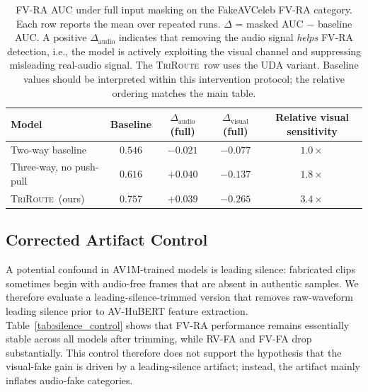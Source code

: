 \documentclass{article}
\newcommand{\method}{\textsc{TriRoute}}
\begin{document}
\begin{table}[t]
    \centering
    \caption{FV-RA AUC under full input masking on the FakeAVCeleb FV-RA category. Each row reports the mean over repeated runs. $\Delta$ = masked AUC $-$ baseline AUC. A positive $\Delta_{\mathrm{audio}}$ indicates that removing the audio signal \emph{helps} FV-RA detection, i.e., the model is actively exploiting the visual channel and suppressing misleading real-audio signal. The \method\ row uses the UDA variant. Baseline values should be interpreted within this intervention protocol; the relative ordering matches the main table.}
    \label{tab:perturbation}
    \small
    \begin{tabular}{lcccc}
        \toprule
        Model & Baseline & $\Delta_{\mathrm{audio}}$ (full) & $\Delta_{\mathrm{visual}}$ (full) & Relative visual sensitivity \\
        \midrule
        Two-way baseline        & $0.546$ & $-0.021$ & $-0.077$ & $1.0\times$ \\
        Three-way, no push-pull & $0.616$ & $+0.040$ & $-0.137$ & $1.8\times$ \\
        \method\ (ours)         & $\mathbf{0.757}$ & $\mathbf{+0.039}$ & $\mathbf{-0.265}$ & $\mathbf{3.4\times}$ \\
        \bottomrule
    \end{tabular}
\end{table}

\subsection{Corrected Artifact Control}

A potential confound in AV1M-trained models is leading silence: fabricated clips sometimes begin with audio-free frames that are absent in authentic samples. We therefore evaluate a leading-silence-trimmed version that removes raw-waveform leading silence prior to AV-HuBERT feature extraction. Table~\ref{tab:silence_control} shows that FV-RA performance remains essentially stable across all models after trimming, while RV-FA and FV-FA drop substantially. This control therefore does not support the hypothesis that the visual-fake gain is driven by a leading-silence artifact; instead, the artifact mainly inflates audio-fake categories.
\end{document}
